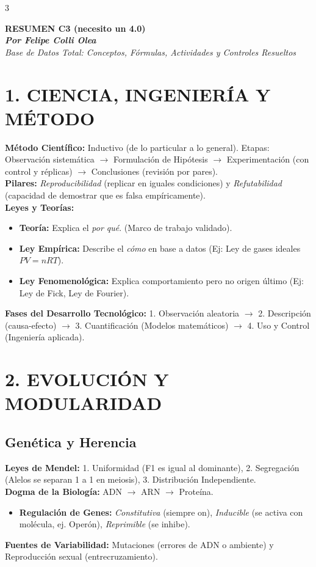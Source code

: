 \documentclass[11pt,landscape,letterpaper]{extarticle}
\begin{document}
\begin{multicols*}{3}
	\raggedright

	\begin{center}
		\textbf{\Large RESUMEN C3 (necesito un 4.0)} \\
		\textit{\textbf{Por Felipe Colli Olea}}\\
		\textit{Base de Datos Total: Conceptos, Fórmulas, Actividades y Controles Resueltos}
	\end{center}

	\section{1. CIENCIA, INGENIERÍA Y MÉTODO}
	\textbf{Método Científico:} Inductivo (de lo particular a lo general). Etapas: Observación sistemática $\rightarrow$ Formulación de Hipótesis $\rightarrow$ Experimentación (con control y réplicas) $\rightarrow$ Conclusiones (revisión por pares). \\
	\textbf{Pilares:} \textit{Reproducibilidad} (replicar en iguales condiciones) y \textit{Refutabilidad} (capacidad de demostrar que es falsa empíricamente).\\
	\textbf{Leyes y Teorías:}
	\begin{itemize}
		\item \textbf{Teoría:} Explica el \textit{por qué}. (Marco de trabajo validado).
		\item \textbf{Ley Empírica:} Describe el \textit{cómo} en base a datos (Ej: Ley de gases ideales $PV=nRT$).
		\item \textbf{Ley Fenomenológica:} Explica comportamiento pero no origen último (Ej: Ley de Fick, Ley de Fourier).
	\end{itemize}
	\textbf{Fases del Desarrollo Tecnológico:} 1. Observación aleatoria $\rightarrow$ 2. Descripción (causa-efecto) $\rightarrow$ 3. Cuantificación (Modelos matemáticos) $\rightarrow$ 4. Uso y Control (Ingeniería aplicada).

	\section{2. EVOLUCIÓN Y MODULARIDAD}
	\subsection{Genética y Herencia}
	\textbf{Leyes de Mendel:} 1. Uniformidad (F1 es igual al dominante), 2. Segregación (Alelos se separan 1 a 1 en meiosis), 3. Distribución Independiente.\\
	\textbf{Dogma de la Biología:} ADN $\rightarrow$ ARN $\rightarrow$ Proteína.
	\begin{itemize}
		\item \textbf{Regulación de Genes:} \textit{Constitutiva} (siempre on), \textit{Inducible} (se activa con molécula, ej. Operón), \textit{Reprimible} (se inhibe).
	\end{itemize}
	\textbf{Fuentes de Variabilidad:} Mutaciones (errores de ADN o ambiente) y Reproducción sexual (entrecruzamiento).


\end{multicols*}
\end{document}
